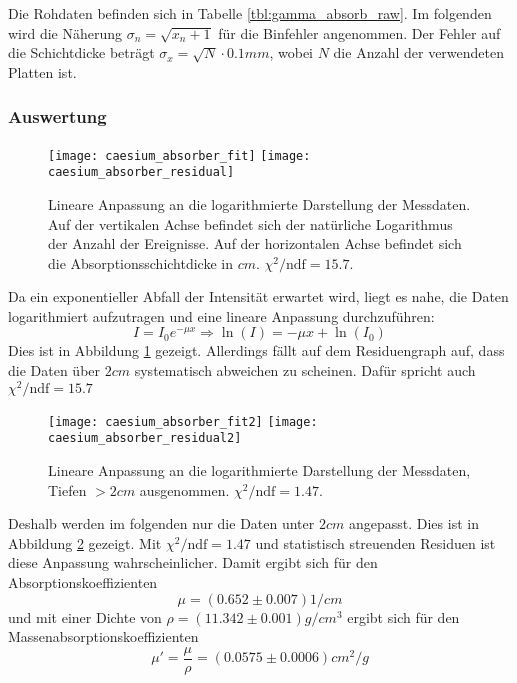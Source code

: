 \documentclass{../Misc/MontavonLaTeX/Montavon}
\newcommand{\halfwidth}{0.48\textwidth}
\begin{document}
Die Rohdaten befinden sich in Tabelle \ref{tbl:gamma_absorb_raw}. Im folgenden wird die Näherung $\sigma_n = \sqrt{x_n + 1}$ für die Binfehler angenommen. Der Fehler auf die Schichtdicke beträgt $\sigma_x = \sqrt{N} \cdot 0.1 \unit{mm}$, wobei $N$ die Anzahl der verwendeten Platten ist.

\subsubsection{Auswertung}
\begin{figure}[htbp]
\centering
\texttt{[image: caesium\_absorber\_fit]}
\texttt{[image: caesium\_absorber\_residual]}
\caption{Lineare Anpassung an die logarithmierte Darstellung der Messdaten. Auf der vertikalen Achse befindet sich der natürliche Logarithmus der Anzahl der Ereignisse. Auf der horizontalen Achse befindet sich die Absorptionsschichtdicke in $\unit{cm}$. $\chi^2 / \textrm{ndf} = 15.7$.}
\label{fig:caesium_absorber_fit}
\end{figure}

Da ein exponentieller Abfall der Intensität erwartet wird, liegt es nahe, die Daten logarithmiert aufzutragen und eine lineare Anpassung durchzuführen:
\[
	I = I_0 e^{-\mu x} \Rightarrow \ln\left(I\right) = -\mu x + \ln\left(I_0\right)
\]
Dies ist in Abbildung \ref{fig:caesium_absorber_fit} gezeigt. Allerdings fällt auf dem Residuengraph auf, dass die Daten über $2 \unit{cm}$ systematisch abweichen zu scheinen. Dafür spricht auch $\chi^2 / \textrm{ndf} = 15.7$

\begin{figure}[htbp]
\centering
\texttt{[image: caesium\_absorber\_fit2]}
\texttt{[image: caesium\_absorber\_residual2]}
\caption{Lineare Anpassung an die logarithmierte Darstellung der Messdaten, Tiefen $> 2 \unit{cm}$ ausgenommen. $\chi^2 / \textrm{ndf} = 1.47$.}
\label{fig:caesium_absorber_fit2}
\end{figure}
Deshalb werden im folgenden nur die Daten unter $2 \unit{cm}$ angepasst. Dies ist in Abbildung \ref{fig:caesium_absorber_fit2} gezeigt. Mit $\chi^2 / \textrm{ndf} = 1.47$ und statistisch streuenden Residuen ist diese Anpassung wahrscheinlicher.
Damit ergibt sich für den Absorptionskoeffizienten
\[
	\mu = (0.652 \pm 0.007) \unit{1/cm}
\]
und mit einer Dichte von $\rho = (11.342 \pm 0.001) \unit{g / cm^3}$ \cite{wiki_blei} ergibt sich für den Massenabsorptionskoeffizienten
\[
	\mu' = \frac{\mu}{\rho} = (0.0575 \pm 0.0006) \unit{cm^2 / g}
\]
\end{document}
